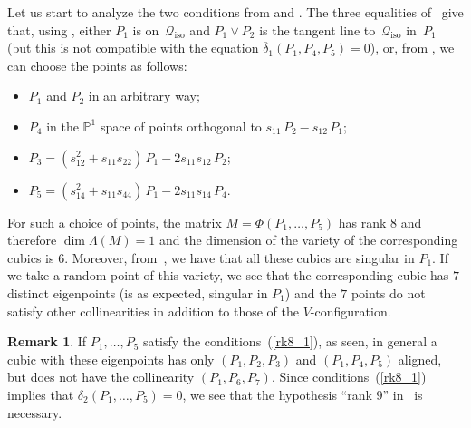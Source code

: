 \documentclass[a4paper, 11pt, reqno]{amsart}
\theoremstyle{plain}
\theoremstyle{definition}
\newtheorem{rmk}[lemma]{Remark}
\newcommand{\p}{\mathbb{P}}
\newcommand{\iso}{\mathcal{Q}_{\mathrm{iso}}}
\begin{document}
Let us start to analyze the two conditions from  and .
The three equalities of~ give that,
using , either $P_1$ is on~$\iso$ and
$P_1\vee P_2$ is the tangent line to~$\iso$ in~$P_1$ (but this is not compatible
with the equation $\overline{\delta}_1(P_1, P_4, P_5)=0$), or,
from , we can choose the points as follows:
%
\begin{itemize}
  \item $P_1$ and $P_2$ in an arbitrary way;
  \item $P_4$ in the $\p^1$
  space of points orthogonal to $s_{11} \, P_2 - s_{12} \, P_1$;
  \item $P_3 = (s_{12}^2+s_{11}s_{22}) \, P_1 - 2s_{11}s_{12} \, P_2$;
  \item $P_5 = (s_{14}^2+s_{11}s_{44}) \, P_1 - 2s_{11}s_{14} \, P_4$.
\end{itemize}
%

For such a choice
of points, the matrix $M = \Phi(P_1, \dots, P_5)$ has rank $8$
and therefore $\dim \Lambda(M) = 1$ and the dimension of the variety
of the corresponding cubics is $6$.
Moreover, from~, we have that all these cubics
are singular in $P_1$.
If we take a random point of this variety, we see that the corresponding
cubic has $7$ distinct eigenpoints (is as expected, singular in $P_1$) and the
$7$ points do not satisfy other collinearities in addition to those of the
$V$-configuration.

\begin{rmk}
\label{rmk:particular_cases}
If $P_1, \dots, P_5$ satisfy the conditions~(\ref{rk8_1}), as seen,
in general a cubic with these eigenpoints has only $(P_1, P_2, P_3)$ and $(P_1, P_4, P_5)$ aligned, but
does not have the collinearity $(P_1, P_6, P_7)$. Since conditions~(\ref{rk8_1})
implies that $\delta_2(P_1, \dots, P_5) = 0$, we see
that the hypothesis ``rank $9$''
in~ is necessary.
\end{rmk}
\end{document}
